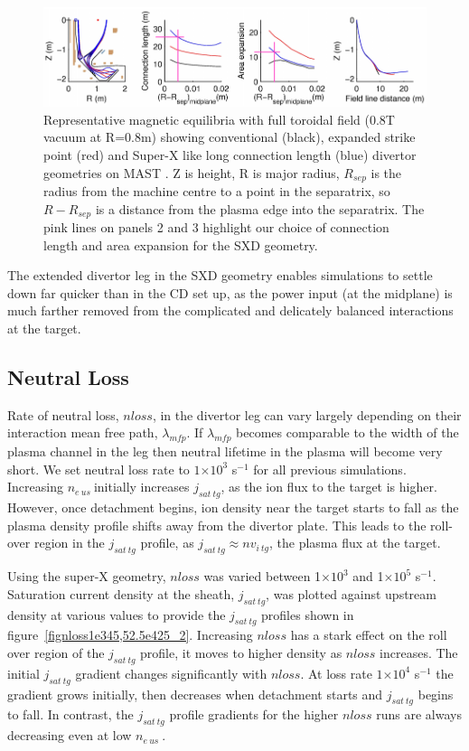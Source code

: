 \documentclass[12pt]{article}  %
\providecommand{\e}[1]{\ensuremath{\times 10^{#1}}} %
\providecommand{\pow}[1]{{$^{#1}$}} %
\providecommand{\neus}{$n_{e~us}~$} %
\begin{document}
\begin{figure}
\includegraphics[scale=0.75]{Figures/MASTUdesignpapersFig2_2.png}
\centering
\caption{Representative magnetic equilibria with full toroidal field (0.8T vacuum at R=0.8m) showing conventional (black), expanded strike point (red) and Super-X like long connection length (blue) divertor geometries on MAST \cite{Fishpool2013}. Z is height, R is major radius, $ R_{sep} $ is the radius from the machine centre to a point in the separatrix, so $ R - R_{sep} $ is a distance from the plasma edge into the separatrix. The pink lines on panels 2 and 3 highlight our choice of connection length and area expansion for the SXD geometry.}\label{figMASTUdesignpapersFig2}
\end{figure}

The extended divertor leg in the SXD geometry enables simulations to settle down far quicker than in the CD set up, as the power input (at the midplane) is much farther removed from the complicated and delicately balanced interactions at the target.


\subsection{Neutral Loss}\label{ssecNloss}
Rate of neutral loss, $nloss$, in the divertor leg can vary largely depending on their interaction mean free path, $\lambda_{mfp}$. If $\lambda_{mfp}$ becomes comparable to the width of the plasma channel in the leg then neutral lifetime in the plasma will become very short. We set neutral loss rate to $1\e{3}$ s\pow{-1} for all previous simulations. Increasing \neus initially increases $j_{sat~tg}$, as the ion flux to the target is higher. However, once detachment begins, ion density near the target starts to fall as the plasma density profile shifts away from the divertor plate. This leads to the roll-over region in the $j_{sat~tg}$ profile, as $j_{sat~tg} \approx nv_{i~tg}$, the plasma flux at the target.

Using the super-X geometry, $nloss$ was varied between 1\e{3} and 1\e{5} s\pow{-1}. Saturation current density at the sheath, $j_{sat~tg}$, was plotted against upstream density at various values to provide the $j_{sat~tg}$ profiles shown in figure~\ref{fignloss1e345,52.5e425_2}. Increasing $nloss$ has a stark effect on the roll over region of the $j_{sat~tg}$ profile, it moves to higher density as $nloss$ increases. The initial $j_{sat~tg}$ gradient changes significantly with $nloss$. At loss rate $1\e{4}$ s\pow{-1} the gradient grows initially, then decreases when detachment starts and $j_{sat~tg}$ begins to fall. In contrast, the $j_{sat~tg}$ profile gradients for the higher $nloss$ runs are always decreasing even at low \neus. 
\end{document}
